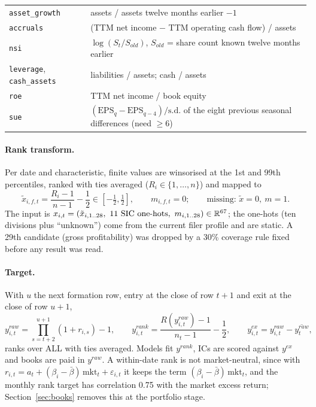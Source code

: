 \begin{table}[t]
\begin{tabular}{@{}ll@{}}
\texttt{asset\_growth} & assets / assets twelve months earlier $-1$ \\
\texttt{accruals} & (TTM net income $-$ TTM operating cash flow) / assets \\
\texttt{nsi} & $\log(S_t/S_{old})$, $S_{old}$ = share count known twelve months earlier \\
\texttt{leverage}, \texttt{cash\_assets} & liabilities / assets; cash / assets \\
\texttt{roe} & TTM net income / book equity \\
\texttt{sue} & $(\mathrm{EPS}_q-\mathrm{EPS}_{q-4})/\mathrm{s.d.}$ of the eight previous seasonal differences (need $\ge6$) \\
\bottomrule
\end{tabular}
\end{table}

\paragraph{Rank transform.}
Per date and characteristic, finite values are winsorised at the 1st and 99th percentiles, ranked with ties averaged ($R_i\in\{1,\dots,n\}$) and mapped to
\begin{equation}\label{eq:rank}
\tilde x_{i,f,t}=\frac{R_i-1}{n-1}-\frac12\in[-\tfrac12,\tfrac12],\qquad m_{i,f,t}=0;\qquad\text{missing: }\tilde x=0,\ m=1 .
\end{equation}
The input is $x_{i,t}=(\tilde x_{i,1..28},\ \text{11 SIC one-hots},\ m_{i,1..28})\in\R^{67}$; the one-hots (ten divisions plus ``unknown'') come from the current filer profile and are static. A 29th candidate (gross profitability) was dropped by a 30\% coverage rule fixed before any result was read.

\paragraph{Target.}
With $u$ the next formation row, entry at the close of row $t{+}1$ and exit at the close of row $u{+}1$,
\begin{equation}\label{eq:yraw}
y^{raw}_{i,t}=\prod_{s=t+2}^{u+1}(1+r_{i,s})-1,\qquad
y^{rank}_{i,t}=\frac{R(y^{raw}_{i,t})-1}{n_t-1}-\frac12,\qquad
y^{ex}_{i,t}=y^{raw}_{i,t}-\overline{y^{raw}_{t}},
\end{equation}
ranks over ALL with ties averaged. Models fit $y^{rank}$, ICs are scored against $y^{ex}$ and books are paid in $y^{raw}$. A within-date rank is not market-neutral, since with $r_{i,t}=a_t+(\beta_i-\bar\beta)\,\mathrm{mkt}_t+\varepsilon_{i,t}$ it keeps the term $(\beta_i-\bar\beta)\,\mathrm{mkt}_t$, and the monthly rank target has correlation 0.75 with the market excess return; Section~\ref{sec:books} removes this at the portfolio stage.

